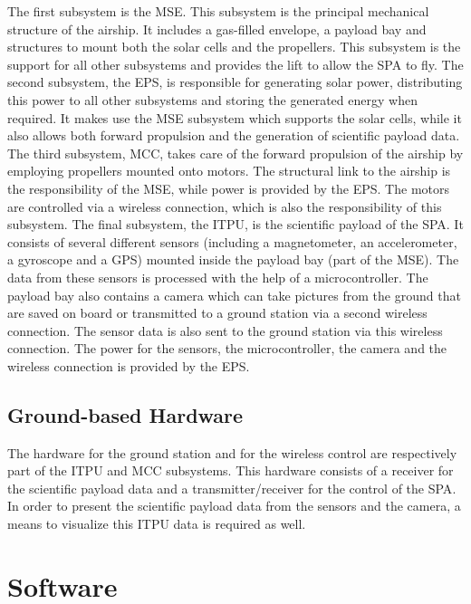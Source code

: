 The first subsystem is the \ac{MSE}. This subsystem is the principal mechanical structure of the airship. It includes a gas-filled envelope, a payload bay and structures to mount both the solar cells and the propellers. This subsystem is the support for all other subsystems and provides the lift to allow the \ac{SPA} to fly. The second subsystem, the \ac{EPS}, is responsible for generating solar power, distributing this power to all other subsystems and storing the generated energy when required. It makes use the \ac{MSE} subsystem which supports the solar cells, while it also allows both forward propulsion and the generation of scientific payload data. The third subsystem, \ac{MCC}, takes care of the forward propulsion of the airship by employing propellers mounted onto motors. The structural link to the airship is the responsibility of the \ac{MSE}, while power is provided by the \ac{EPS}. The motors are controlled via a wireless connection, which is also the responsibility of this subsystem. The final subsystem, the \ac{ITPU}, is the scientific payload of the \ac{SPA}. It consists of several different sensors (including a magnetometer, an accelerometer, a gyroscope and a \ac{GPS}) mounted inside the payload bay (part of the \ac{MSE}). The data from these sensors is processed with the help of a microcontroller. The payload bay also contains a camera which can take pictures from the ground that are saved on board or transmitted to a ground station via a second wireless connection. The sensor data is also sent to the ground station via this wireless connection. The power for the sensors, the microcontroller, the camera and the wireless connection is provided by the \ac{EPS}.

\subsection{Ground-based Hardware}

The hardware for the ground station and for the wireless control are respectively part of the \ac{ITPU} and \ac{MCC} subsystems.  This hardware consists of a receiver for the scientific payload data and a transmitter/receiver for the control of the \ac{SPA}.  In order to present the scientific payload data from the sensors and the camera, a means to visualize this \ac{ITPU} data is required as well.

\section{Software}
\label{sec:intro_software}

